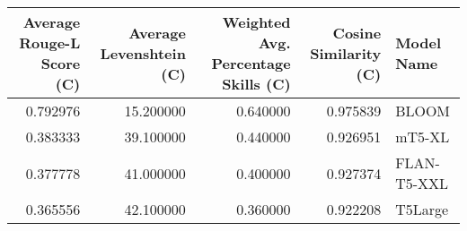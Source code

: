\begin{tabular}{rrrrl}
\toprule
Average Rouge-L Score (C) & Average Levenshtein (C) & Weighted Avg. Percentage Skills (C) & Cosine Similarity (C) & Model Name \\
\midrule
0.792976 & 15.200000 & 0.640000 & 0.975839 & BLOOM \\
0.383333 & 39.100000 & 0.440000 & 0.926951 & mT5-XL \\
0.377778 & 41.000000 & 0.400000 & 0.927374 & FLAN-T5-XXL \\
0.365556 & 42.100000 & 0.360000 & 0.922208 & T5Large \\
\bottomrule
\end{tabular}

